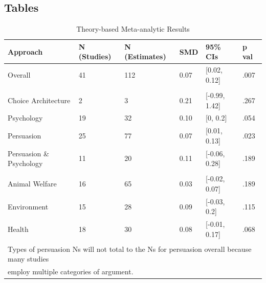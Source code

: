 \documentclass[sn-nature,referee,pdflatex]{sn-jnl}
\begin{document}
\newpage

\subsection{Tables}\label{tables}

\begin{table}[!h]
\centering
\caption{\label{tab:table_one}Theory-based Meta-analytic Results}
\centering
\begin{tabular}[t]{llllll}
\toprule
Approach & N (Studies) & N (Estimates) & SMD & 95\% CIs & p val\\
\midrule
Overall & 41 & 112 & 0.07 & {}[0.02, 0.12] & .007\\
\addlinespace[0.5em]
\multicolumn{6}{l}{\textbf{Theory}}\\
\hspace{1em}Choice Architecture & 2 & 3 & 0.21 & {}[-0.99, 1.42] & .267\\
\hspace{1em}Psychology & 19 & 32 & 0.10 & {}[0, 0.2] & .054\\
\hspace{1em}Persuasion & 25 & 77 & 0.07 & {}[0.01, 0.13] & .023\\
\hspace{1em}Persuasion \& Psychology & 11 & 20 & 0.11 & {}[-0.06, 0.28] & .189\\
\addlinespace[0.5em]
\multicolumn{6}{l}{\textbf{Type of Persuasion}}\\
\hspace{1em}Animal Welfare & 16 & 65 & 0.03 & {}[-0.02, 0.07] & .189\\
\hspace{1em}Environment & 15 & 28 & 0.09 & {}[-0.03, 0.2] & .115\\
\hspace{1em}Health & 18 & 30 & 0.08 & {}[-0.01, 0.17] & .068\\
\bottomrule
\multicolumn{6}{l}{\textsuperscript{} Types of persuasion Ns will not total to the Ns for persuasion overall because many studies}\\
\multicolumn{6}{l}{employ multiple categories of argument.}\\
\end{tabular}
\end{table}
\end{document}
